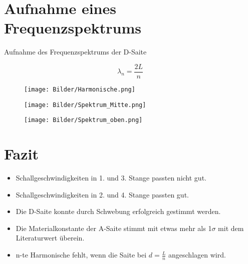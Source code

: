 \documentclass[11pt]{beamer}
\begin{document}
\section{Aufnahme eines Frequenzspektrums}
\begin{frame}{Aufnahme des Frequenzspektrums der D-Saite}
\begin{multicols}{2}
\begin{equation*}
\lambda_n=	\frac{2L}{n}
\end{equation*}
\begin{figure}
\texttt{[image: Bilder/Harmonische.png]}
\end{figure}
\end{multicols}
\end{frame}
\begin{frame}
\begin{figure}[H]
\centering
\texttt{[image: Bilder/Spektrum\_Mitte.png]}

\end{figure}

\begin{figure}[H]
\centering
\texttt{[image: Bilder/Spektrum\_oben.png]}
\end{figure}
\end{frame}

\section{Fazit}
\begin{frame}
\begin{itemize}
\item Schallgeschwindigkeiten in 1. und 3. Stange passten nicht gut.
\item Schallgeschwindigkeiten in 2. und 4. Stange passten gut.
\item Die D-Saite konnte durch Schwebung erfolgreich gestimmt werden.
\item Die Materialkonstante der A-Saite stimmt mit etwas mehr als 1$\sigma$ mit dem Literaturwert überein.
\item n-te Harmonische fehlt, wenn die Saite bei $d=\frac{L}{n}$ angeschlagen wird.
\end{itemize}
\end{frame}
\end{document}
